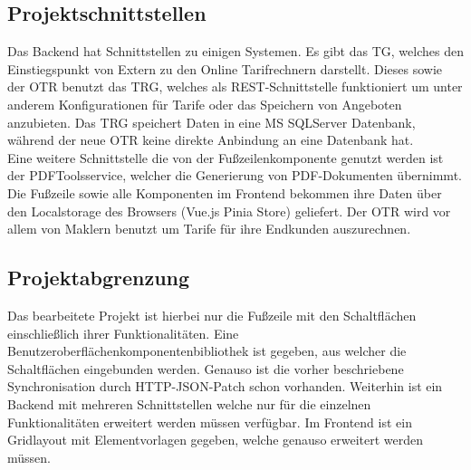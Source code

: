 \subsection{Projektschnittstellen}
\label{projektschnittstellen}
Das Backend hat %
Schnittstellen zu einigen Systemen. Es gibt das \ac{TG}, welches den Einstiegspunkt von Extern zu den Online Tarifrechnern darstellt. Dieses sowie der \ac{OTR} benutzt das \ac{TRG}, welches als REST-Schnittstelle funktioniert um unter anderem Konfigurationen für Tarife oder das Speichern von Angeboten anzubieten. Das \ac{TRG} speichert Daten in eine MS SQLServer Datenbank, während der neue \ac{OTR} keine direkte Anbindung an eine Datenbank hat. \\ %
Eine weitere Schnittstelle die von der Fußzeilenkomponente genutzt werden ist der PDFToolsservice, welcher die Generierung von PDF-Dokumenten übernimmt. Die Fußzeile sowie alle Komponenten im Frontend bekommen ihre Daten über den Localstorage des Browsers (Vue.js Pinia Store) geliefert.
Der \ac{OTR} wird vor allem von Maklern benutzt um Tarife für ihre Endkunden auszurechnen.
\subsection{Projektabgrenzung}
\label{projektabgrenzung}
Das bearbeitete Projekt ist hierbei nur die Fußzeile mit den Schaltflächen einschließlich ihrer Funktionalitäten. Eine Benutzeroberflächenkomponentenbibliothek ist gegeben, aus welcher die Schaltflächen eingebunden werden. Genauso ist die vorher beschriebene Synchronisation durch HTTP-JSON-Patch schon vorhanden. Weiterhin ist ein Backend mit mehreren Schnittstellen welche nur für die einzelnen Funktionalitäten erweitert werden müssen verfügbar. Im Frontend ist ein Gridlayout mit Elementvorlagen gegeben, welche genauso erweitert werden müssen.